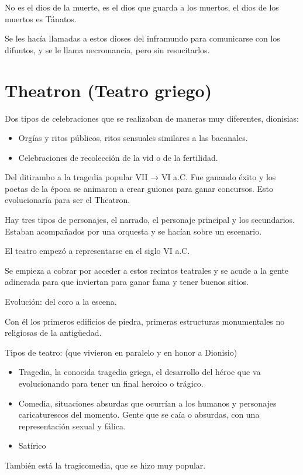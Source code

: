 No es el dios de la muerte, es el dios que guarda a los muertos, el dios de los muertos es Tánatos.

Se les hacía llamadas a estos dioses del inframundo para comunicarse con los difuntos, y se le llama necromancia, pero sin resucitarlos.

\section{Theatron (Teatro griego)}
Dos tipos de celebraciones que se realizaban de maneras muy diferentes, dionisias:
\begin{itemize}
    \item Orgías y ritos públicos, ritos sensuales similares a las bacanales.
    \item Celebraciones de recolección de la vid o de la fertilidad.
\end{itemize}

Del ditirambo a la tragedia popular VII → VI a.C. Fue ganando éxito y los poetas de la época se animaron a crear guiones para ganar concursos. Esto evolucionaría para ser el Theatron.

Hay tres tipos de personajes, el narrado, el personaje principal y los secundarios. Estaban acompañados por una orquesta y se hacían sobre un escenario.

El teatro empezó a representarse en el siglo VI a.C.

Se empieza a cobrar por acceder a estos recintos teatrales y se acude a la gente adinerada para que inviertan para ganar fama y tener buenos sitios.

Evolución: del coro a la escena.

Con él los primeros edificios de piedra, primeras estructuras monumentales no religiosas de la antigüedad.

Tipos de teatro: (que vivieron en paralelo y en honor a Dionisio)
\begin{itemize}
    \item Tragedia, la conocida tragedia griega, el desarrollo del héroe que va evolucionando para tener un final heroico o trágico.
    \item Comedia, situaciones absurdas que ocurrían a los humanos y personajes caricaturescos del momento. Gente que se caía o absurdas, con una representación sexual y fálica.
    \item Satírico
\end{itemize}

También está la tragicomedia, que se hizo muy popular.


